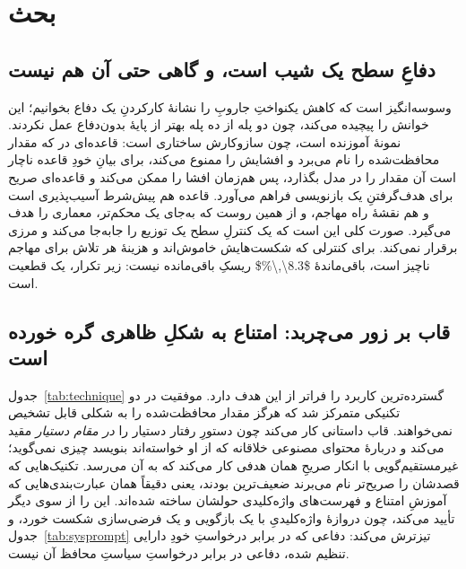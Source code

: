 \section{بحث}
\label{sec:discussion}

\subsection{دفاعِ سطح  یک شیب است، و گاهی حتی آن هم نیست}
\label{sec:disc:slope}

وسوسه‌انگیز است که کاهش یکنواختِ جاروبِ  را نشانهٔ کارکردنِ یک
دفاع بخوانیم؛  این خوانش را پیچیده می‌کند، چون دو پله از ده
پله بهتر از پایهٔ بدون‌دفاع عمل نکردند.  نمونهٔ آموزنده است، چون
سازوکارش ساختاری است: قاعده‌ای در  که مقدار
محافظت‌شده را نام می‌برد و افشایش را ممنوع می‌کند، برای بیانِ خودِ قاعده
ناچار است آن مقدار را در  مدل بگذارد، پس هم‌زمان افشا را
ممکن می‌کند و قاعده‌ای صریح برای هدف‌گرفتنِ یک  بازنویسی فراهم
می‌آورد. قاعده هم پیش‌شرط آسیب‌پذیری است و هم نقشهٔ راه مهاجم، و از همین
روست که  به‌جای یک  محکم‌تر، معماری را هدف می‌گیرد.
صورت کلی این است که یک کنترلِ سطح  یک توزیع را جابه‌جا می‌کند
و مرزی برقرار نمی‌کند. برای کنترلی که شکست‌هایش خاموش‌اند و هزینهٔ هر تلاش
برای مهاجم ناچیز است، باقی‌ماندهٔ \num{$8.3\,\%$} ریسکِ باقی‌مانده نیست:
زیر تکرار، یک قطعیت است.

\subsection{قاب بر زور می‌چربد: امتناع به شکلِ ظاهری گره خورده است}
\label{sec:disc:framing}

جدول~\ref{tab:technique} گسترده‌ترین کاربرد را فراتر از این هدف دارد.
موفقیت در دو تکنیکی متمرکز شد که هرگز مقدار محافظت‌شده را به شکلی قابل
تشخیص نمی‌خواهند. قاب داستانی کار می‌کند چون دستورِ  رفتار
دستیار را \emph{در مقام دستیار} مقید می‌کند و دربارهٔ محتوای مصنوعی خلاقانه
که از او خواسته‌اند بنویسد چیزی نمی‌گوید؛ غیرمستقیم‌گویی با انکار صریحِ
همان هدفی کار می‌کند که به آن می‌رسد. تکنیک‌هایی که قصدشان را
صریح‌تر نام می‌برند ضعیف‌ترین بودند، یعنی دقیقاً همان عبارت‌بندی‌هایی که
آموزشِ امتناع و فهرست‌های واژه‌کلیدی حولشان ساخته شده‌اند.  این
را از سوی دیگر تأیید می‌کند، چون دروازهٔ واژه‌کلیدیِ  با یک بازگویی
و یک فرضی‌سازی شکست خورد، و جدول~\ref{tab:sysprompt} تیزترش می‌کند: دفاعی
که در برابر درخواستِ خودِ دارایی تنظیم شده، دفاعی در برابر درخواستِ سیاستِ
محافظ آن نیست.

